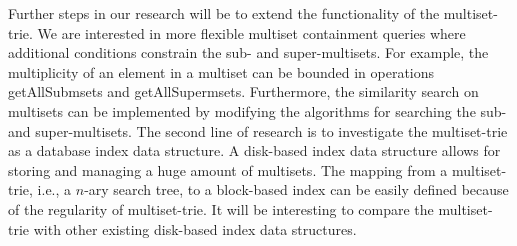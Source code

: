 \documentclass[algorithms,article,accept,pdftex,moreauthors]{Definitions/mdpi}
\begin{document}
%
Further steps in our research will be to extend the functionality of the multiset-trie. We are interested in more flexible multiset containment queries where additional conditions constrain the sub- and super-multisets. For example, the multiplicity of an element in a multiset can be bounded in operations getAllSubmsets and getAllSupermsets. Furthermore, the similarity search on multisets can be implemented by modifying the algorithms for searching the sub- and super-multisets. 
%
The second line of research is to investigate the multiset-trie as a database index data structure. A disk-based index data structure allows for storing and managing a huge amount of multisets. The mapping from a multiset-trie, i.e., a $n$-ary search tree, to a block-based index can be easily defined because of the regularity of multiset-trie. It will be interesting to compare the multiset-trie with other existing disk-based index data structures.

\vspace{6pt} 



\end{document}
